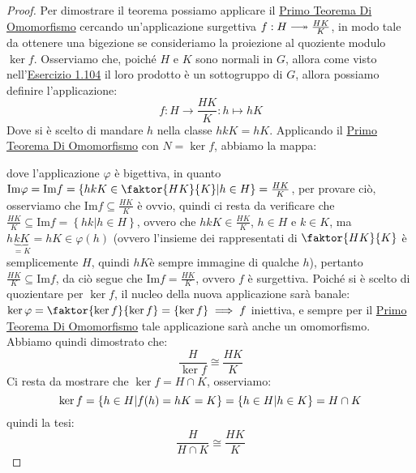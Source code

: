 \documentclass[11pt]{scrartcl}
\begin{document}
\begin{proof}
Per dimostrare il teorema possiamo applicare il \hyperref[g:1]{Primo Teorema Di Omomorfismo} cercando un'applicazione surgettiva $f: H \twoheadlongrightarrow \frac{HK}{K}$, in modo tale da ottenere una bigezione se consideriamo la proiezione al quoziente modulo $\ker f$. Osserviamo che, poiché $H$ e $K$ sono normali in $G$, allora come visto nell'\hyperref[g:sgrpr]{Esercizio 1.104} il loro prodotto è un sottogruppo di $G$, allora possiamo definire l'applicazione:
		\[ f: H \longrightarrow \frac{HK}{K} : h \longmapsto hK
		\]
Dove si è scelto di mandare $h$ nella classe $hkK = hK$. Applicando il \hyperref[g:1]{Primo Teorema Di Omomorfismo} con $N=\ker f$, abbiamo la mappa:
	\begin{center}
	\end{center}
dove l'applicazione $\varphi$ è bigettiva, in quanto $\text{Im}\varphi=\text{Im}f = \left\{hkK \in \faktor{HK}{K} \m h \in H\right\}=\frac{HK}{K}$, per provare ciò, osserviamo che $\text{Im}f \subseteq \frac{HK}{K}$ è ovvio, quindi ci resta da verificare che $\frac{HK}{K} \subseteq \text{Im}f = \left\{hk | h \in H\right\}$, ovvero che $hkK \in \frac{HK}{K}$, $h \in H$ e $k \in K$, ma $h\underbrace{kK}_{=K} = hK \in \varphi(h)$ (ovvero l'insieme dei rappresentati di $\faktor{HK}{K}$ è semplicemente $H$, quindi $hK$è sempre immagine di qualche $h$), pertanto $\frac{HK}{K} \subseteq \text{Im}f$, da ciò segue che $\text{Im}f =\frac{HK}{K}$, ovvero $f$ è surgettiva. Poiché si è scelto di quozientare per $\ker f$, il nucleo della nuova applicazione sarà banale: $\ker \varphi = \faktor {\ker f}{\ker f}= \left\{\ker f\right\} \implies f$ iniettiva, e sempre per il \hyperref[g:1]{Primo Teorema Di Omomorfismo} tale applicazione sarà anche un omomorfismo. Abbiamo quindi dimostrato che:
	\[ \frac{H}{\ker f} \cong \frac{HK}{K}
	\]
Ci resta da mostrare che $\ker f = H \cap K$, osserviamo:
	\[ \ker f = \left\{h \in H \middle| f(h) = hK =K\right\} =  \left\{h \in H \middle| h \in K\right\} = H \cap K
	\]
quindi la tesi:
	\[ \frac{H}{H \cap K} \cong \frac{HK}{K}
	\]
\end{proof}

\newpage
\end{document}
